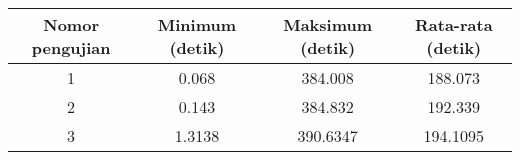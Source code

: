 \begin{tabular}{| c | c | c | c |}
    \hline
    Nomor pengujian & Minimum (detik) & Maksimum (detik) & Rata-rata (detik) \\
    \hline
    \hline
    1 & 0.068 & 384.008 & 188.073 \\
    \hline
    2 & 0.143 & 384.832 & 192.339 \\
    \hline
    3 & 1.3138 & 390.6347 & 194.1095 \\
    \hline
\end{tabular}